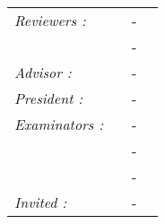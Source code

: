 \begin{titlepage}
\begin{center}
\noindent \large 
\begin{tabular}{llcl}
      \textit{Reviewers :}	&   \textsc{ }		& - &   \\
				&   \textsc{ }		& - &  \\
      \textit{Advisor :}	&  \textsc{}		& - &  \\
      \textit{President :}	&  \textsc{}		& - & \\
      \textit{Examinators :}   &  \textsc{}          & - & \\
      				&  \textsc{}			& - & \\
      				& \textsc{}		& - & \\
      \textit{Invited :}		&  \textsc{}		& - & 
\end{tabular}
\end{center}


\end{titlepage}
\sloppy

\titlepage
